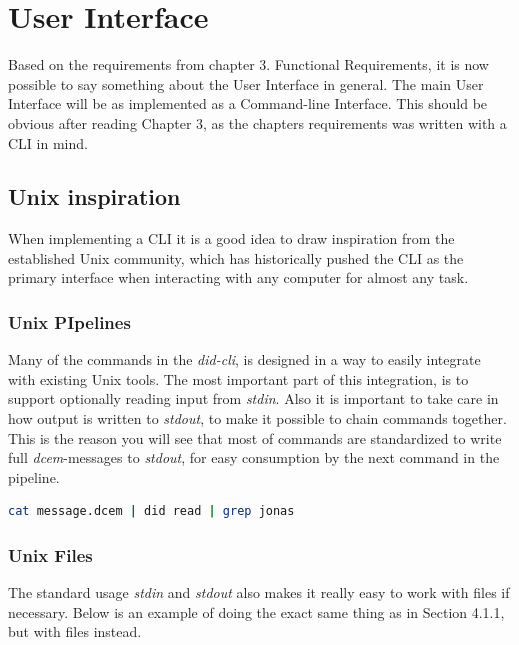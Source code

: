 \hypertarget{user-interface}{%
\chapter{User Interface}\label{user-interface}}

Based on the requirements from chapter 3. Functional Requirements, it is
now possible to say something about the User Interface in general. The
main User Interface will be as implemented as a Command-line Interface.
This should be obvious after reading Chapter 3, as the chapters
requirements was written with a CLI in mind.

\hypertarget{unix-inspiration}{%
\section{Unix inspiration}\label{unix-inspiration}}

When implementing a CLI it is a good idea to draw inspiration from the
established Unix community, which has historically pushed the CLI as the
primary interface when interacting with any computer for almost any
task.

\hypertarget{unix-pipelines}{%
\subsection{\texorpdfstring{\textbf{Unix
PIpelines}}{Unix PIpelines}}\label{unix-pipelines}}

Many of the commands in the \emph{did-cli}, is designed in a way to
easily integrate with existing Unix tools. The most important part of
this integration, is to support optionally reading input from
\emph{stdin}. Also it is important to take care in how output is written
to \emph{stdout}, to make it possible to chain commands together. This
is the reason you will see that most of commands are standardized to
write full \emph{dcem}-messages to \emph{stdout}, for easy consumption
by the next command in the pipeline.

\begin{lstlisting}[language=bash]
cat message.dcem | did read | grep jonas
\end{lstlisting}

\hypertarget{unix-files}{%
\subsection{Unix Files}\label{unix-files}}

The standard usage \emph{stdin} and \emph{stdout} also makes it really
easy to work with files if necessary. Below is an example of doing the
exact same thing as in Section 4.1.1, but with files instead.

